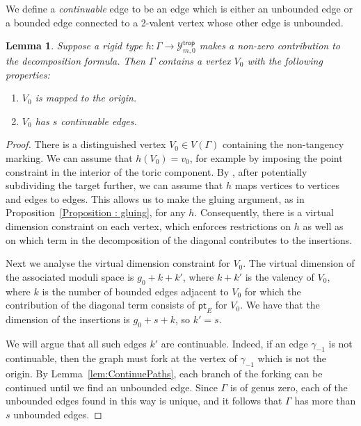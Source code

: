 \documentclass[11pt]{amsart}
\numberwithin{equation}{section}
\theoremstyle{plain}
\newtheorem{lemma}[theorem]{Lemma}
\theoremstyle{remark}
\theoremstyle{definition}
\newcommand{\cY}{\mathcal{Y}}
\begin{document}
We define a \textit{continuable} edge to be an edge which is either an unbounded edge or a bounded edge connected to a 2-valent vertex whose other edge is unbounded.

\begin{lemma}\label{lem:continuable edges}
    Suppose a rigid type $h\colon \Gamma \rightarrow \cY_{m,0}^{\mathsf{trop}}$ makes a non-zero contribution to the decomposition formula. Then $\Gamma$ contains a vertex $V_0$ with the following properties:
    \begin{enumerate}
        \item $V_0$ is mapped to the origin.
        \item $V_0$ has $s$ continuable edges.
    \end{enumerate} 
\end{lemma}

\begin{proof}
There is a distinguished vertex $V_0 \in V(\Gamma)$ containing the non-tangency marking. We can assume that $h(V_0) = v_0$, for example by imposing the point constraint in the interior of the toric component. By \cite[Remark 6.1.1]{ranganthan2022logarithmic}, after potentially subdividing the target further, we can assume that $h$ maps vertices to vertices and edges to edges. This allows us to make the gluing argument, as in Proposition~\ref{Proposition : gluing}, for any $h$. Consequently, there is a virtual dimension constraint on each vertex, which enforces restrictions on $h$ as well as on which term in the decomposition of the diagonal contributes to the insertions.

Next we analyse the virtual dimension constraint for $V_0$. The virtual dimension of the associated moduli space is $g_0 + k + k'$, where $k+k'$ is the valency of $V_0$, where $k$ is the number of bounded edges adjacent to $V_0$ for which the contribution of the diagonal term consists of $\mathsf{pt}_E$ for $V_0$. We have that the dimension of the insertions is $g_0 + s +k$, so $k'= s$.
 
We will argue that all such edges $k'$ are continuable. Indeed, if an edge $\gamma_{-1}$ is not continuable, then the graph must fork at the vertex of $\gamma_{-1}$ which is not the origin. By Lemma~\ref{lem:ContinuePaths}, each branch of the forking can be continued until we find an unbounded edge. Since $\Gamma$ is of genus zero, each of the unbounded edges found in this way is unique, and it follows that $\Gamma$ has more than $s$ unbounded edges. 
\end{proof}
\end{document}
